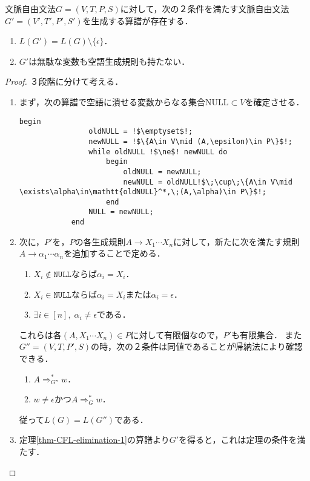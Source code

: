 \documentclass[uplatex, dvipdfmx]{jsreport}
\begin{document}
\begin{theorem}\label{thm-CFL-elimination-2}
    文脈自由文法$G=(V,T,P,S)$に対して，次の２条件を満たす文脈自由文法
    $G'=(V',T',P',S')$を生成する算譜が存在する．
    \begin{enumerate}
        \item $L(G')=L(G)\setminus\{\epsilon\}$．
        \item $G'$は無駄な変数も空語生成規則も持たない．
    \end{enumerate}
\end{theorem}
\begin{proof}３段階に分けて考える．
    \begin{enumerate}
        \item まず，次の算譜で空語に潰せる変数からなる集合NULL$\subset V$を確定させる．
        \begin{lstlisting}[escapechar=!]
            begin
                oldNULL = !$\emptyset$!;
                newNULL = !$\{A\in V\mid (A,\epsilon)\in P\}$!;
                while oldNULL !$\ne$! newNULL do
                    begin
                        oldNULL = newNULL;
                        newNULL = oldNULL!$\;\cup\;\{A\in V\mid \exists\alpha\in\mathtt{oldNULL}^*,\;(A,\alpha)\in P\}$!;
                    end
                NULL = newNULL;
            end
        \end{lstlisting}
        \item 次に，$P'$を，$P$の各生成規則$A\to X_1\cdots X_n$に対して，新たに次を満たす規則$A\to\alpha_1\cdots\alpha_n$を追加することで定める．
        \begin{enumerate}[(1)]
            \item $X_i\notin\mathtt{NULL}$ならば$\alpha_i=X_i$．
            \item $X_i\in\mathtt{NULL}$ならば$\alpha_i=X_i$または$\alpha_i=\epsilon$．
            \item $\exists i\in[n],\;\alpha_i\ne\epsilon$である．
        \end{enumerate}
        これらは各$(A,X_1\cdots X_n)\in P$に対して有限個なので，$P'$も有限集合．
        また$G''=(V,T,P',S)$の時，次の２条件は同値であることが帰納法により確認できる．
        \begin{enumerate}[(1)]
            \item $A\Rightarrow^*_{G''}w$．
            \item $w\ne\epsilon$かつ$A\Rightarrow^*_Gw$．
        \end{enumerate}
        従って$L(G)=L(G'')$である．
        \item 定理\ref{thm-CFL-elimination-1}の算譜より$G'$を得ると，これは定理の条件を満たす．
    \end{enumerate}
\end{proof}
\end{document}

